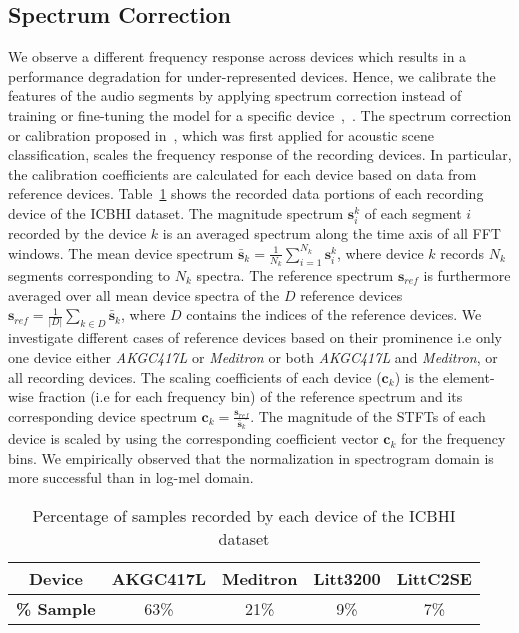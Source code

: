 \documentclass[journal]{IEEEtran}
\begin{document}
\subsection{Spectrum Correction}
We observe a different frequency response across devices which results in a performance degradation for under-represented devices. Hence, we calibrate the features of the audio segments by applying spectrum correction instead of training or fine-tuning the model for a specific device~\cite{kochetov2018noise},~\cite{gairola2020respirenet}. The spectrum correction or calibration proposed in~\cite{nguyen2020acoustic}, which was first applied for acoustic scene classification, scales the frequency response of the recording devices. In particular, the calibration coefficients are calculated for each device based on data from reference devices. Table~\ref{device_sample} shows the recorded data portions of each recording device of the ICBHI dataset. The magnitude spectrum $\boldsymbol{s}^{k}_{i}$ of each segment $i$ recorded by the device $k$ is an averaged spectrum along the time axis of all FFT windows. The mean device spectrum $\bar{\boldsymbol{s}}_k = \frac{1}{N_k}\sum_{i=1}^{N_k}{{\boldsymbol{s}}^k_i}$, where device $k$ records $N_k$ segments corresponding to $N_k$ spectra. The reference spectrum $\boldsymbol{s}_{ref}$ is furthermore averaged over all mean device spectra of the $D$ reference devices $\boldsymbol{s}_{ref}=\frac{1}{|D|}\sum_{k \in D}{\bar{\boldsymbol{s}}_k}$, where $D$ contains the indices of the reference devices. We investigate different cases of reference devices based on their prominence i.e only one device either \textit{AKGC417L} or \textit{Meditron} or both \textit{AKGC417L} and \textit{Meditron}, or all recording devices. The scaling coefficients of each device ($\boldsymbol{c}_{k}$) is the element-wise fraction (i.e for each frequency bin) of the reference spectrum and its corresponding device spectrum $\boldsymbol{c}_{k} = \frac{\boldsymbol{s}_{ref}}{\bar{\boldsymbol{s}}_k}$. The magnitude of the STFTs of each device is scaled by using the corresponding coefficient vector $\boldsymbol{c}_{k}$ for the frequency bins. We empirically observed that the normalization in spectrogram domain is more successful than in log-mel domain.

\begin{table}[t]
    \renewcommand{\arraystretch}{1.3}
    \caption{Percentage of samples recorded by each device of the ICBHI dataset}
    \label{device_sample}
    \centering
    
    \begin{tabular}{c c c c c}
        \hline
        \textbf{Device} & \textbf{AKGC417L} & \textbf{Meditron} & \textbf{Litt3200} & \textbf{LittC2SE}\\
        \hline
        \textbf{\% Sample} & 63\% & 21\% & 9\% & 7\% \\
        \hline
    \end{tabular}
\end{table}
\end{document}
